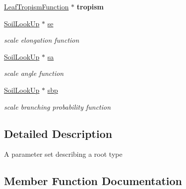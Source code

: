 \begin{DoxyCompactItemize}
\mbox{\label{classCPlantBox_1_1LeafRandomOrganParameter_a0e8f29890f4e989820b12c925611aa36}} 
\hyperlink{classCPlantBox_1_1LeafTropismFunction}{Leaf\+Tropism\+Function} $\ast$ {\bfseries tropism}
\item 
\mbox{\label{classCPlantBox_1_1LeafRandomOrganParameter_a2ea6272dd598bb81c9f8088ea432812e}} 
\hyperlink{classCPlantBox_1_1SoilLookUp}{Soil\+Look\+Up} $\ast$ \hyperlink{classCPlantBox_1_1LeafRandomOrganParameter_a2ea6272dd598bb81c9f8088ea432812e}{se}
\begin{DoxyCompactList}\small\item\em scale elongation function \end{DoxyCompactList}\item 
\mbox{\label{classCPlantBox_1_1LeafRandomOrganParameter_aa3979fab1037847b6b0ba6e9fb3f64f9}} 
\hyperlink{classCPlantBox_1_1SoilLookUp}{Soil\+Look\+Up} $\ast$ \hyperlink{classCPlantBox_1_1LeafRandomOrganParameter_aa3979fab1037847b6b0ba6e9fb3f64f9}{sa}
\begin{DoxyCompactList}\small\item\em scale angle function \end{DoxyCompactList}\item 
\mbox{\label{classCPlantBox_1_1LeafRandomOrganParameter_a54f61a13a939cf1758c4b07285534efc}} 
\hyperlink{classCPlantBox_1_1SoilLookUp}{Soil\+Look\+Up} $\ast$ \hyperlink{classCPlantBox_1_1LeafRandomOrganParameter_a54f61a13a939cf1758c4b07285534efc}{sbp}
\begin{DoxyCompactList}\small\item\em scale branching probability function \end{DoxyCompactList}\end{DoxyCompactItemize}


\subsection{Detailed Description}
A parameter set describing a root type 

\subsection{Member Function Documentation}
\mbox{\label{classCPlantBox_1_1LeafRandomOrganParameter_a48407c07450bfabeeb7a4e1d28e51616}} 
